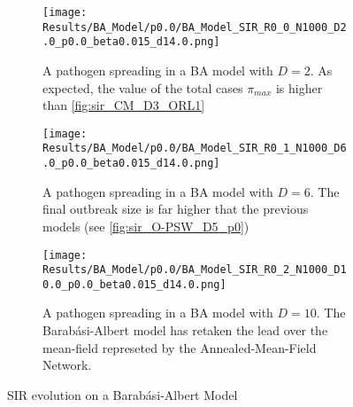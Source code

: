 \documentclass[a4paper,10pt,twoside]{book} %
\theoremstyle{definition}
\begin{document}
\begin{figure}[p]
	\begin{subfigure}{\linewidth}
		\texttt{[image: Results/BA\_Model/p0.0/BA\_Model\_SIR\_R0\_0\_N1000\_D2.0\_p0.0\_beta0.015\_d14.0.png]}
		\caption{A pathogen spreading in a BA model with $D = 2$. As expected, the value of the total cases $ \pi_{max}$ is higher than \autoref{fig:sir_CM_D3_ORL1}}
		\label{fig:sir_BA_D2}
	\end{subfigure}
	\vspace{.5cm}
	\begin{subfigure}{\linewidth}
		\texttt{[image: Results/BA\_Model/p0.0/BA\_Model\_SIR\_R0\_1\_N1000\_D6.0\_p0.0\_beta0.015\_d14.0.png]}
		\caption{A pathogen spreading in a BA model with $D = 6$. The final outbreak size is far higher that the previous models (see \autoref{fig:sir_O-PSW_D5_p0})}
		\label{fig:sir_BA_D6}
	\end{subfigure}
	\vfill
	\begin{subfigure}{\linewidth}
		\texttt{[image: Results/BA\_Model/p0.0/BA\_Model\_SIR\_R0\_2\_N1000\_D10.0\_p0.0\_beta0.015\_d14.0.png]}
		\caption{A pathogen spreading in a BA model with $D = 10$. The Barabási-Albert model has retaken the lead over the mean-field represeted by the Annealed-Mean-Field Network.}
		\label{fig:sir_BA_D10}
	\end{subfigure}
	\caption{SIR evolution on a Barabási-Albert Model}
	\label{fig:sir_BA_COVID}
\end{figure}

\clearpage
\end{document}

